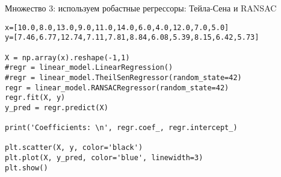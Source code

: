 \documentclass[landscape]{slides}
\begin{document}
\begin{slide}
Множество 3: используем робастные регрессоры: Тейла-Сена и RANSAC
\begin{verbatim}
x=[10.0,8.0,13.0,9.0,11.0,14.0,6.0,4.0,12.0,7.0,5.0]
y=[7.46,6.77,12.74,7.11,7.81,8.84,6.08,5.39,8.15,6.42,5.73]

X = np.array(x).reshape(-1,1)
#regr = linear_model.LinearRegression()
#regr = linear_model.TheilSenRegressor(random_state=42)
regr = linear_model.RANSACRegressor(random_state=42)
regr.fit(X, y)
y_pred = regr.predict(X)
  
print('Coefficients: \n', regr.coef_, regr.intercept_)

plt.scatter(X, y, color='black')
plt.plot(X, y_pred, color='blue', linewidth=3)
plt.show()
\end{verbatim}
\end{slide}
\end{document}
